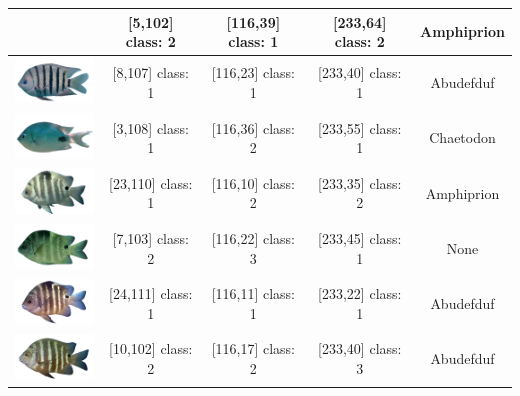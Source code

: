 \begin{longtable}{|c|c|c|c|c|}
	& [5,102] class: 2 & [116,39] class: 1 & [233,64] class: 2 & Amphiprion \\
	\hline
	\includegraphics[width=3cm]{gambar/dataset_validasi/Abudefduf06}
	& [8,107] class: 1 & [116,23] class: 1 & [233,40] class: 1 & Abudefduf \\
	\hline
	\includegraphics[width=3cm]{gambar/dataset_validasi/Abudefduf07}
	& [3,108] class: 1 & [116,36] class: 2 & [233,55] class: 1 & Chaetodon \\
	\hline
	\includegraphics[width=3cm]{gambar/dataset_validasi/Abudefduf08}
	& [23,110] class: 1 & [116,10] class: 2 & [233,35] class: 2 & Amphiprion \\
	\hline
	\includegraphics[width=3cm]{gambar/dataset_validasi/Abudefduf09}
	& [7,103] class: 2 & [116,22] class: 3 & [233,45] class: 1 & None \\
	\hline
	\includegraphics[width=3cm]{gambar/dataset_validasi/Abudefduf10}
	& [24,111] class: 1 & [116,11] class: 1 & [233,22] class: 1 & Abudefduf \\
	\hline
	\includegraphics[width=3cm]{gambar/dataset_validasi/Abudefduf11}
	& [10,102] class: 2 & [116,17] class: 2 & [233,40] class: 3 & Abudefduf \\

\end{longtable}
